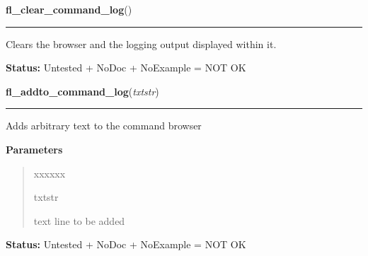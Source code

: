     \label{xformslib:library:fl_clear_command_log}

    \vspace{0.5ex}

\hspace{.8\funcindent}\begin{boxedminipage}{\funcwidth}

    \raggedright \textbf{fl\_clear\_command\_log}()

    \vspace{-1.5ex}

    \rule{\textwidth}{0.5\fboxrule}
\setlength{\parskip}{2ex}
    Clears the browser and the logging output displayed within it.

\setlength{\parskip}{1ex}
\textbf{Status:} Untested + NoDoc + NoExample = NOT OK



    \end{boxedminipage}

    \label{xformslib:library:fl_addto_command_log}

    \vspace{0.5ex}

\hspace{.8\funcindent}\begin{boxedminipage}{\funcwidth}

    \raggedright \textbf{fl\_addto\_command\_log}(\textit{txtstr})

    \vspace{-1.5ex}

    \rule{\textwidth}{0.5\fboxrule}
\setlength{\parskip}{2ex}
    Adds arbitrary text to the command browser

\setlength{\parskip}{1ex}
      \textbf{Parameters}
      \vspace{-1ex}

      \begin{quote}
        \begin{Ventry}{xxxxxx}

          \item[txtstr]

          text line to be added

        \end{Ventry}

      \end{quote}

\textbf{Status:} Untested + NoDoc + NoExample = NOT OK



    \end{boxedminipage}

